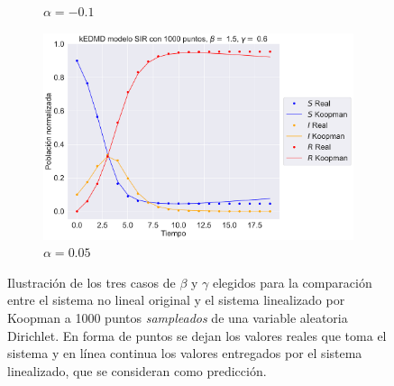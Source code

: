 \begin{figure}[htbp]
\begin{subfigure}[b]{0.45\textwidth}
        \caption{$\alpha=-0.1$}
        \label{fig:image2}
    \end{subfigure}
    \hfill
    \begin{subfigure}[b]{0.45\textwidth}
        \centering
        \includegraphics[width=\textwidth]{img/content/chapter3/SIR3.pdf}
        \caption{$\alpha=0.05$}
    \end{subfigure}
    \caption{Ilustración de los tres casos de $\beta$ y $\gamma$ elegidos para la comparación entre el sistema no lineal original y el sistema linealizado por Koopman a 1000 puntos \textit{sampleados} de una variable aleatoria Dirichlet. En forma de puntos se dejan los valores reales que toma el sistema y en línea continua los valores entregados por el sistema linealizado, que se consideran como predicción.}
    \label{fig:Comp_traj_SIR}
\end{figure}

